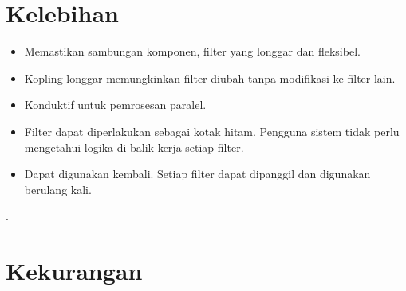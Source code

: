\documentclass{article}
\begin{document}
	\section{Kelebihan}
	
	\begin{itemize}
		\item Memastikan sambungan komponen, filter yang longgar dan fleksibel.
		\item Kopling longgar memungkinkan filter diubah tanpa modifikasi ke filter lain.
		\item Konduktif untuk pemrosesan paralel.
		\item Filter dapat diperlakukan sebagai kotak hitam. Pengguna sistem tidak perlu mengetahui logika di balik kerja setiap filter.
		\item Dapat digunakan kembali. Setiap filter dapat dipanggil dan digunakan berulang kali.
	\end{itemize}
.
	
	
	\section{Kekurangan}
	
\end{document}

